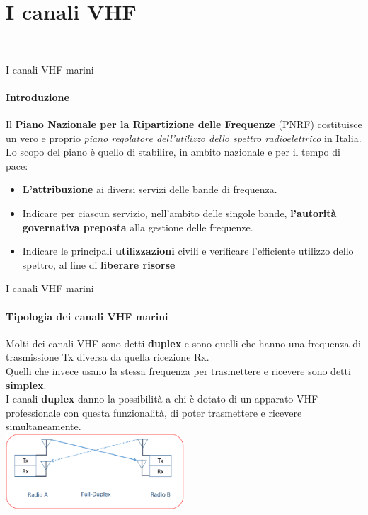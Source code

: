 \documentclass[aspectratio=169]{beamer}
\newcommand*{\vet}{\fontfamily{qzc}\selectfont}
\begin{document}
\section{I canali VHF}
\begin{frame}
	\\
\end{frame}

\begin{frame}{I canali VHF marini}
	\framesubtitle{Introduzione}
	Il \textbf{Piano Nazionale per la Ripartizione delle Frequenze} (PNRF) costituisce un vero e proprio \emph{piano regolatore dell'utilizzo dello spettro radioelettrico} in Italia.\\
	\smallskip
	Lo scopo del piano è quello di stabilire, in ambito nazionale e per il tempo di pace:
	\begin{itemize}
		\item \textbf{L'attribuzione} ai diversi servizi delle bande di frequenza.
		\item Indicare per ciascun servizio, nell'ambito delle singole bande, \textbf{l'autorità governativa preposta} alla gestione delle frequenze.
		\item Indicare le principali \textbf{utilizzazioni} civili e verificare l'efficiente utilizzo dello spettro, al fine di \textbf{liberare risorse}
	\end{itemize}
\end{frame}

\begin{frame}{I canali VHF marini}
	\framesubtitle{Tipologia dei canali VHF marini}
	Molti dei canali VHF sono detti \textbf{duplex} e sono quelli che hanno una frequenza di trasmissione {\vet Tx} diversa da quella ricezione {\vet Rx}.\\
	Quelli che invece usano la stessa frequenza per trasmettere e ricevere sono detti \textbf{simplex}.\\
	\smallskip
	I canali \textbf{duplex} danno la possibilità a chi è dotato di un apparato VHF professionale con questa funzionalità, di poter trasmettere e ricevere simultaneamente.\\
	\medskip
	\centering
	\includegraphics[width=0.5\textwidth]{Imgs/Duplex}
\end{frame}
\end{document}
